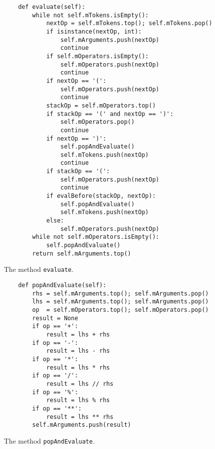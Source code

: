 \begin{figure}[!ht]
  \centering
\begin{verbatim}
    def evaluate(self):
        while not self.mTokens.isEmpty():
            nextOp = self.mTokens.top(); self.mTokens.pop()
            if isinstance(nextOp, int):
                self.mArguments.push(nextOp)
                continue
            if self.mOperators.isEmpty():
                self.mOperators.push(nextOp)
                continue
            if nextOp == '(':
                self.mOperators.push(nextOp)
                continue
            stackOp = self.mOperators.top()
            if stackOp == '(' and nextOp == ')':
                self.mOperators.pop()
                continue
            if nextOp == ')':
                self.popAndEvaluate()
                self.mTokens.push(nextOp)
                continue
            if stackOp == '(':
                self.mOperators.push(nextOp)
                continue
            if evalBefore(stackOp, nextOp):
                self.popAndEvaluate()
                self.mTokens.push(nextOp)
            else:
                self.mOperators.push(nextOp)
        while not self.mOperators.isEmpty():
            self.popAndEvaluate()
        return self.mArguments.top()
\end{verbatim}
\vspace*{-0.3cm}
  \caption{The method \texttt{evaluate}.}
  \label{fig:evaluate}
\end{figure} 

\begin{figure}[!ht]
\centering
\begin{verbatim}
    def popAndEvaluate(self):
        rhs = self.mArguments.top(); self.mArguments.pop()
        lhs = self.mArguments.top(); self.mArguments.pop()
        op  = self.mOperators.top(); self.mOperators.pop()
        result = None
        if op == '+':
            result = lhs + rhs
        if op == '-':
            result = lhs - rhs
        if op == '*':
            result = lhs * rhs
        if op == '/':
            result = lhs // rhs
        if op == '%':
            result = lhs % rhs
        if op == '**':
            result = lhs ** rhs
        self.mArguments.push(result)                
\end{verbatim}
\vspace*{-0.3cm}
\caption{The method \texttt{popAndEvaluate}.}
\label{fig:popAndEvaluate}
\end{figure}

